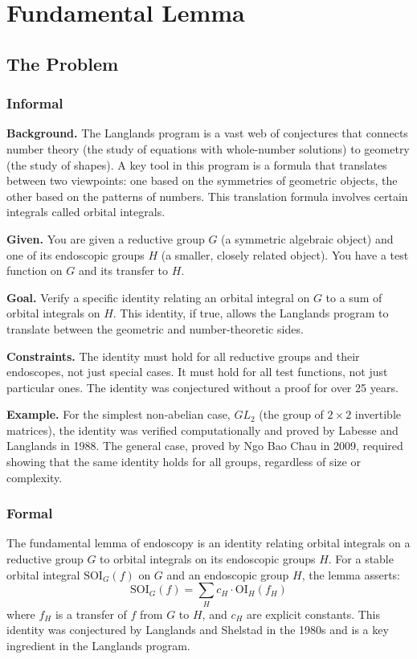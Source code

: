 \let\LocalMacro\relax

\chapter{Fundamental Lemma}

\section{The Problem}

\subsection{Informal}

\textbf{Background.} The Langlands program is a vast web of conjectures that connects number theory (the study of equations with whole-number solutions) to geometry (the study of shapes). A key tool in this program is a formula that translates between two viewpoints: one based on the symmetries of geometric objects, the other based on the patterns of numbers. This translation formula involves certain integrals called orbital integrals.

\textbf{Given.} You are given a reductive group $G$ (a symmetric algebraic object) and one of its endoscopic groups $H$ (a smaller, closely related object). You have a test function on $G$ and its transfer to $H$.

\textbf{Goal.} Verify a specific identity relating an orbital integral on $G$ to a sum of orbital integrals on $H$. This identity, if true, allows the Langlands program to translate between the geometric and number-theoretic sides.

\textbf{Constraints.} The identity must hold for all reductive groups and their endoscopes, not just special cases. It must hold for all test functions, not just particular ones. The identity was conjectured without a proof for over 25 years.

\textbf{Example.} For the simplest non-abelian case, $GL_2$ (the group of $2 \times 2$ invertible matrices), the identity was verified computationally and proved by Labesse and Langlands in 1988. The general case, proved by Ngo Bao Chau in 2009, required showing that the same identity holds for all groups, regardless of size or complexity.

\subsection{Formal}
The fundamental lemma of endoscopy is an identity relating orbital integrals on a reductive group $G$ to orbital integrals on its endoscopic groups $H$. For a stable orbital integral $\mathrm{SOI}_G(f)$ on $G$ and an endoscopic group $H$, the lemma asserts:
\[
\mathrm{SOI}_G(f) = \sum_{H} c_H \cdot \mathrm{OI}_H(f_H)
\]
where $f_H$ is a transfer of $f$ from $G$ to $H$, and $c_H$ are explicit constants. This identity was conjectured by Langlands and Shelstad in the 1980s and is a key ingredient in the Langlands program.

